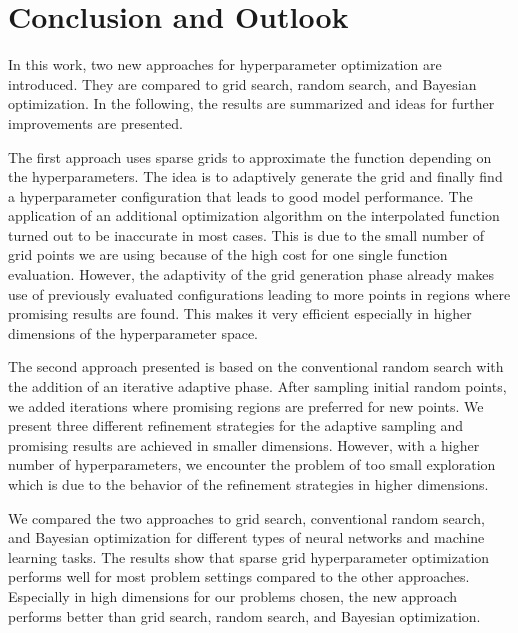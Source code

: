 
\chapter{Conclusion and Outlook}\label{chapter:conclusion_and_outlook}

In this work, two new approaches for hyperparameter optimization are introduced. They are compared to grid search, random search, and Bayesian optimization. In the following, the results are summarized and ideas for further improvements are presented. \newline

The first approach uses sparse grids to approximate the function depending on the hyperparameters. The idea is to adaptively generate the grid and finally find a hyperparameter configuration that leads to good model performance. The application of an additional optimization algorithm on the interpolated function turned out to be inaccurate in most cases. This is due to the small number of grid points we are using because of the high cost for one single function evaluation. However, the adaptivity of the grid generation phase already makes use of previously evaluated configurations leading to more points in regions where promising results are found. This makes it very efficient especially in higher dimensions of the hyperparameter space. \newline 

The second approach presented is based on the conventional random search with the addition of an iterative adaptive phase. After sampling initial random points, we added iterations where promising regions are preferred for new points. We present three different refinement strategies for the adaptive sampling and promising results are achieved in smaller dimensions. However, with a higher number of hyperparameters, we encounter the problem of too small exploration which is due to the behavior of the refinement strategies in higher dimensions. \newline 

We compared the two approaches to grid search, conventional random search, and Bayesian optimization for different types of neural networks and machine learning tasks. The results show that sparse grid hyperparameter optimization performs well for most problem settings compared to the other approaches. Especially in high dimensions for our problems chosen, the new approach performs better than grid search, random search, and Bayesian optimization. 

